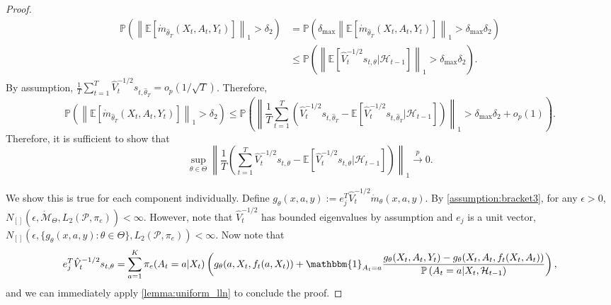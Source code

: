 \documentclass[11pt]{article}
\newcommand{\E}{\mathbb{E}}
\newcommand{\norm}[1]{\left\lVert#1\right\rVert}
\begin{document}
\begin{appendix}
\begin{proof}
\begin{align*}
    \mathbb{P} \left( \norm{ \E\left[ \dot{m}_{\hat{\theta}_{T}}(X_{t},A_{t},Y_{t}) \right]}_{1} > \delta_{2} \right) &=     \mathbb{P} \left( \delta_{\text{max}} \norm{ \E\left[ \dot{m}_{\hat{\theta}_{T}}(X_{t},A_{t},Y_{t}) \right]}_{1} > \delta_{\text{max}} \delta_{2} \right)\\
    &\le  \mathbb{P} \left( \norm{\mathbb{E}\left[\hat{V}_{t}^{-1/2}s_{t,\theta} | \mathcal{H}_{t-1} \right]}_{1} > \delta_{\text{max}} \delta_{2} \right).
\end{align*}
By assumption, $\frac{1}{T}\sum_{t=1}^{T} \hat{V}_{t}^{-1/2} s_{t,\hat{\theta}_{T}} = o_{p}(1/\sqrt{T})$. Therefore, 
$$ \mathbb{P} \left( \norm{ \E\left[ \dot{m}_{\hat{\theta}_{T}}(X_{t},A_{t},Y_{t}) \right]}_{1} > \delta_{2} \right) \le \mathbb{P} \left( \norm{\frac{1}{T} \sum_{t=1}^{T} \left(\hat{V}_{t}^{-1/2} s_{t,\hat{\theta}_{T}} - \mathbb{E}\left[\hat{V}_{t}^{-1/2}s_{t,\hat{\theta}_{T}} | \mathcal{H}_{t-1}\right]\right)}_{1} > \delta_{\text{max}} \delta_{2} + o_{p}(1) \right).$$
Therefore, it is sufficient to show that 
$$\sup_{\theta \in \Theta }\norm{\frac{1}{T} \left(\sum_{t=1}^{T} \hat{V}_{t}^{-1/2} s_{t,\theta} - \mathbb{E}\left[\hat{V}_{t}^{-1/2}s_{t,\theta} |\mathcal{H}_{t-1}\right]\right)}_{1} \overset{p}{\rightarrow}  0.$$

We show this is true for each component individually. Define $g_{\theta}(x,a,y) := e_{j}^{T}\hat{V}_{t}^{-1/2} \dot{m}_{\theta}(x,a,y)$. By \cref{assumption:bracket3}, for any $\epsilon >0$, $N_{[]}(\epsilon, \dot{\mathcal{M}}_{\Theta}, L_{2}(\mathcal{P},\pi_{e})) < \infty$. However, note that $\hat{V}_{t}^{-1/2}$ has bounded eigenvalues by assumption and $e_j$ is a unit vector, $N_{[]}(\epsilon, \{g_{\theta}(x,a,y) : \theta \in \Theta\}, L_{2}(\mathcal{P},\pi_{e})) < \infty$. Now note that
$$ e_{j}^{T}\hat{V}_{t}^{-1/2} s_{t,\theta} =\sum_{a=1}^{K} \pi_{e}(A_{t} =a | X_{t}) \left( g_{\theta}(a,X_{t},f_{t}(a,X_{t}))   + \mathbbm{1}_{A_{t} = a} \frac{ g_{\theta}(X_{t},A_{t},Y_{t})  -  g_{\theta}(X_{t},A_{t},f_{t}(X_{t},A_{t})) }{ \mathbb{P} \left(A_{t} =a | X_{t},\mathcal{H}_{t-1} \right)  }\right),$$
and we can immediately apply \cref{lemma:uniform_lln} to conclude the proof. 
\end{proof}


\end{appendix}
\end{document}
